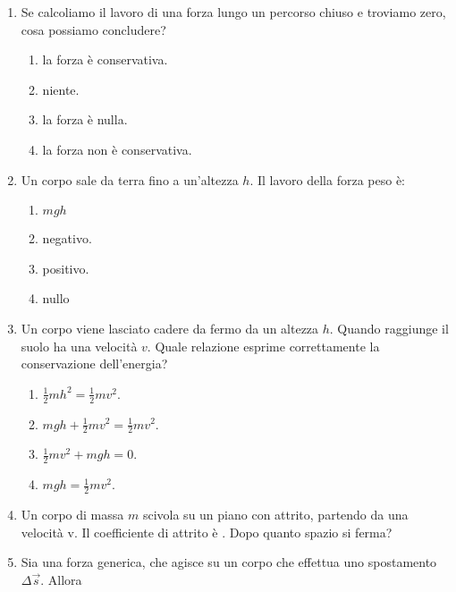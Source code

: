\documentclass{article}
\begin{document}
\begin{enumerate}
\begin{enumerate}[label=\Alph*.]
  \end{enumerate}
  \item Se calcoliamo il lavoro di una forza lungo un percorso chiuso e troviamo zero, cosa possiamo concludere?
  \begin{enumerate}[label=\Alph*.]
    \item la forza è conservativa.
    \item niente.
    \item la forza è nulla.
    \item la forza non è conservativa.
  \end{enumerate}
  \item Un corpo sale da terra fino a un'altezza $h$. Il lavoro della forza peso è:
  \begin{enumerate}[label=\Alph*.]
    \item $mgh$
    \item negativo.
    \item positivo.
    \item nullo
  \end{enumerate}
  \item Un corpo viene lasciato cadere da fermo da un altezza $h$. Quando raggiunge il suolo ha una velocità $v$. Quale relazione esprime correttamente la conservazione dell'energia?
  \begin{enumerate}[label=\Alph*.]
    \item $\frac{1}{2}mh^2=\frac{1}{2}mv^2$.
    \item $mgh+\frac{1}{2}mv^2=\frac{1}{2}mv^2.$
    \item $\frac{1}{2}mv^2+mgh=0.$
    \item $mgh=\frac{1}{2}mv^2$.
  \end{enumerate}
  \item Un corpo di massa $m$ scivola su un piano con attrito, partendo da una velocità v. Il coefficiente di attrito è \mu. Dopo quanto spazio si ferma?
  \begin{enumerate}[label=\Alph*.]
    \item $\frac{1}{2}v^2+\mu g$.
    \item $\frac{1}{2}v^2-\mu g$.
    \item $\frac{v^2}{2g\mu}}$.
    \item $\frac{2v^2}{g\mu}}$.
  \end{enumerate}
  \item Sia  una forza generica, che agisce su un corpo che effettua uno spostamento $\Delta \vec{s}$. Allora
  \begin{enumerate}[label=\Alph*.]

\end{enumerate}
\end{enumerate}
\end{document}
